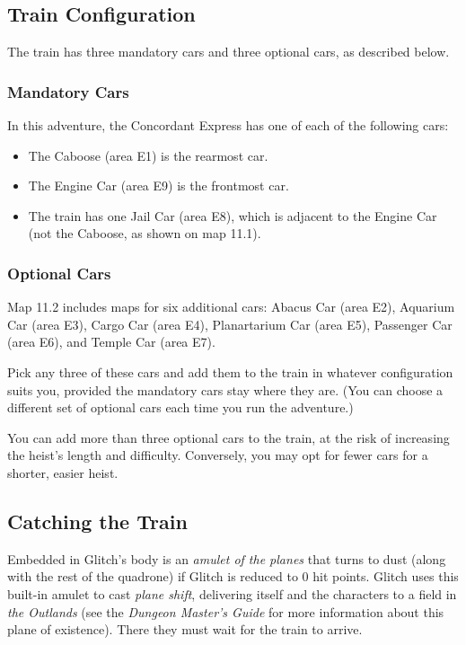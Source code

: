 \documentclass[10pt,a4paper,twoside,bg=print,twocolumn,openany,nodeprecatedcode]{dndbook}
\begin{document}
\subsection{Train Configuration}
The train has three mandatory cars and three optional cars, as described below.

\subsubsection{Mandatory Cars}
In this adventure, the Concordant Express has one of each of the following cars:


\begin{itemize}
\item The Caboose (area E1) is the rearmost car.
\item The Engine Car (area E9) is the frontmost car.
\item The train has one Jail Car (area E8), which is adjacent to the Engine Car (not the Caboose, as shown on map 11.1).
\end{itemize}

\subsubsection{Optional Cars}
Map 11.2 includes maps for six additional cars: Abacus Car (area E2), Aquarium Car (area E3), Cargo Car (area E4), Planartarium Car (area E5), Passenger Car (area E6), and Temple Car (area E7).

Pick any three of these cars and add them to the train in whatever configuration suits you, provided the mandatory cars stay where they are. (You can choose a different set of optional cars each time you run the adventure.)

You can add more than three optional cars to the train, at the risk of increasing the heist's length and difficulty. Conversely, you may opt for fewer cars for a shorter, easier heist.

\subsection{Catching the Train}
Embedded in Glitch's body is an \textit{amulet of the planes} that turns to dust (along with the rest of the quadrone) if Glitch is reduced to 0 hit points. Glitch uses this built-in amulet to cast \textit{plane shift}, delivering itself and the characters to a field in \textit{the Outlands} (see the \textit{Dungeon Master's Guide} for more information about this plane of existence). There they must wait for the train to arrive.
\end{document}
